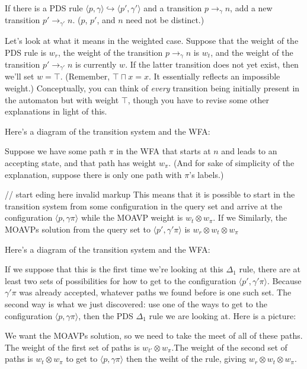 \documentclass{article}
\newcommand{\Config}[2]{\ensuremath{\langle #1, #2 \rangle}}
\newcommand{\Rule}[2]{\ensuremath{#1 \hookrightarrow #2}}
\newcommand{\Trans}[3]{\ensuremath{#1 \rightarrow_{#2} #3}}
\newcommand{\meet}{\sqcap}
\newcommand{\extend}{\otimes}
\begin{document}
   If there is a PDS rule
   \Rule{\Config{p}{\gamma}}{\Config{p'}{\gamma'}} and a transition
   \Trans{p}{\gamma}{n}, add a new transition
   \Trans{p'}{\gamma'}{n}. ($p$, $p'$, and $n$ need not be distinct.)

Let's look at what it means in the weighted case. Suppose that the
weight of the PDS rule is $w_r$, the weight of the transition
\Trans{p}{\gamma}{n} is $w_t$, and the weight of the transition
\Trans{p'}{\gamma'}{n} is currently $w$. If the latter transition does
not yet exist, then we'll set $w = \top$. (Remember, $\top \meet x =
x$. It essentially reflects an impossible weight.) Conceptually, you
can think of \emph{every} transition being initially present in the
automaton but with weight $\top$, though you have to revise some other
explanations in light of this.

Here's a diagram of the transition system and the WFA:

Suppose we have some path $\pi$ in the WFA that starts at $n$ and
leads to an accepting state, and that path has weight $w_\pi$. (And
for sake of simplicity of the explanation, suppose there is only one
path with $\pi$'s labels.)

// start eding here invalid markup
This means that it is possible to start in the transition system from some
  configuration in the query set and arrive at the configuration
  \Config{p}{\gamma \pi} while the MOAVP weight is $w_t \extend
  w_\pi$.\footnotemark
If we Similarly, the MOAVPs solution from the query set to
  \Config{p'}{\gamma'\pi} is $w_r \extend w_t \extend w_\pi$



Here's a diagram of the transition system and the WFA:

If we suppose that this is the first time we're looking at this
$\Delta_1$ rule, there are at least two sets of possibilities for how
to get to the configuration \Config{p'}{\gamma'\pi}. Because
$\gamma'\pi$ was already accepted, whatever paths we found before is
one such set. The second way is what we just discovered: use one of
the ways to get to the configuration \Config{p}{\gamma \pi}, then the
PDS $\Delta_1$ rule we are looking at. Here is a picture:

We want the MOAVPs solution, so we need to take the meet of all of
these paths. The weight of the first set of paths is $w_{t'} \extend
w_\pi$.\footnotemark The weight of the second set of paths is $w_t
\extend w_\pi$ to get to \Config{p}{\gamma \pi} then the weiht of the
rule, giving $w_r \extend w_t \extend w_\pi$.
\end{document}

